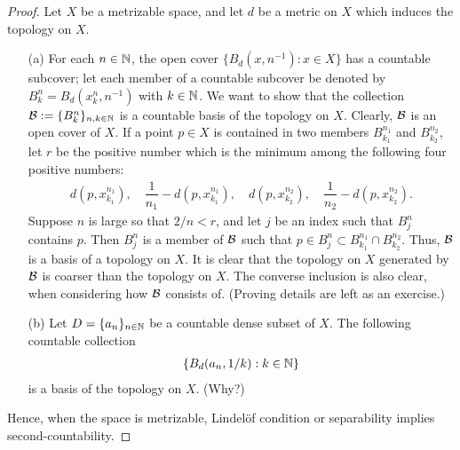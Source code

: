 \begin{proof}
    Let $X$ be a metrizable space, and let $d$ be a metric on $X$ which induces the topology on $X$.
    \begin{enumerate}
        \item[(a)]
        {
            For each $n\in{\mathbb{N}}$, the open cover $\{B_d\left(x, n^{-1}\right): x\in X\}$ has a countable subcover; let each member of a countable subcover be denoted by $B_k^n=B_d(x_k^n, n^{-1})$ with $k\in{\mathbb{N}}$.
            We want to show that the collection ${\mathcal{B}}:=\{B_k^n\}_{n, k\in{\mathbb{N}}}$ is a countable basis of the topology on $X$.
            Clearly, ${\mathcal{B}}$ is an open cover of $X$.
            If a point $p\in X$ is contained in two members $B_{k_1}^{n_1}$ and $B_{k_2}^{n_2}$, let $r$ be the positive number which is the minimum among the following four positive numbers:
            \begin{align*}
                d(p, x_{k_1}^{n_1}),\quad\dfrac{1}{n_1}-d(p, x_{k_1}^{n_1}),\quad d(p, x_{k_2}^{n_2}),\quad\dfrac{1}{n_2}-d(p, x_{k_2}^{n_2}).
            \end{align*}
            Suppose $n$ is large so that $2/n<r$, and let $j$ be an index such that $B_j^n$ contains $p$.
            Then $B_j^n$ is a member of ${\mathcal{B}}$ such that $p\in B_j^n\subset B_{k_1}^{n_1}\cap B_{k_2}^{n_2}$.
            Thus, ${\mathcal{B}}$ is a basis of a topology on $X$.
            It is clear that the topology on $X$ generated by ${\mathcal{B}}$ is coarser than the topology on $X$.
            The converse inclusion is also clear, when considering how ${\mathcal{B}}$ consists of. \color{brown}(Proving details are left as an exercise.)\color{brown}
        }
        \item[(b)]
        {
            Let $D=\{a_n\}_{n\in{\mathbb{N}}}$ be a countable dense subset of $X$.
            The following countable collection
            \begin{align*}
                \left\{B_d(a_n, 1/k): k\in{\mathbb{N}}\right\}
            \end{align*}
            is a basis of the topology on $X$. \color{brown}(Why?)\color{black}
        }
    \end{enumerate}
    Hence, when the space is metrizable, Lindel\"{o}f condition or separability implies second-countability.
\end{proof}


